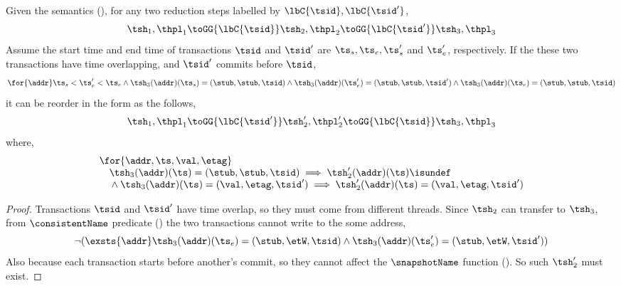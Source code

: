 \begin{lem}
\label{lem:reorder-concurrency}
Given the semantics (), for any two reduction steps labelled by \( \lbC{\tsid}, \lbC{\tsid'} \),
\[
    \tsh_{1}, \thpl_{1} \toGG{\lbC{\tsid}} \tsh_{2}, \thpl_{2} \toGG{\lbC{\tsid'}} \tsh_{3}, \thpl_{3}
\]
Assume the start time and end time of transactions \( \tsid \) and \( \tsid' \) are \( \ts_{s}, \ts_{e}, \ts_{s}' \) and \( \ts_{e}' \), respectively.
If the these two transactions have time overlapping, and \( \tsid' \) commits before \( \tsid \),  \ie
\[
\begin{array}{@{}l@{}}
    \for{\addr} 
    \ts_{s} < \ts_{e}' < \ts_{e}
    \land \tsh_{3}(\addr)(\ts_{s}) = (\stub, \stub, \tsid)
    \land \tsh_{3}(\addr)(\ts_{e}') = (\stub, \stub, \tsid')
    \land \tsh_{3}(\addr)(\ts_{e}) = (\stub, \stub, \tsid)
\end{array}
\]
it can be reorder in the form as the follows,
\[
\begin{array}{@{}l@{}}
    \tsh_{1}, \thpl_{1} \toGG{\lbC{\tsid'}} \tsh_{2}', \thpl_{2}' \toGG{\lbC{\tsid}} \tsh_{3}, \thpl_{3}
\end{array}
\]
where,
\[
\begin{array}{@{}l@{}}
    \for{\addr, \ts,\val,\etag} \\
    \quad \tsh_{3}(\addr)(\ts) = (\stub, \stub, \tsid) \implies \tsh_{2}'(\addr)(\ts) \isundef \\ 
    \quad {} \land \tsh_{3}(\addr)(\ts) = (\val, \etag, \tsid') \implies \tsh_{2}'(\addr)(\ts) = (\val, \etag, \tsid')
\end{array}
\]
\end{lem}
\begin{proof}
Transactions \( \tsid \) and \( \tsid' \) have time overlap, so they must come from different threads.
Since \( \tsh_{2} \) can transfer to \( \tsh_{3} \), from \( \consistentName \) predicate () the two transactions cannot write to the some address,
\[
    \neg (\exsts{\addr} \tsh_{3}(\addr)(\ts_{e}) = (\stub, \etW, \tsid) \land  \tsh_{3}(\addr)(\ts_{e}') = (\stub, \etW, \tsid'))
\]
Also because each transaction starts before another's commit, so they cannot affect the \( \snapshotName \) function ().
So such \( \tsh_{2}' \) must exist.
\end{proof}


